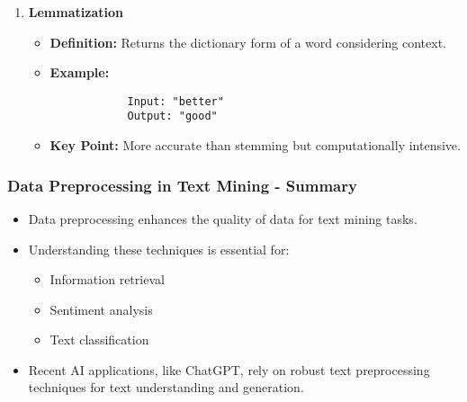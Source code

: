 \documentclass[aspectratio=169]{beamer}
\begin{document}
\begin{frame}[fragile]
\begin{enumerate}
        \item \textbf{Lemmatization}  
        \begin{itemize}
            \item \textbf{Definition:} Returns the dictionary form of a word considering context.
            \item \textbf{Example:} 
            \begin{lstlisting}
            Input: "better"
            Output: "good"
            \end{lstlisting}
            \item \textbf{Key Point:} More accurate than stemming but computationally intensive.
        \end{itemize}
    \end{enumerate}
\end{frame}

\begin{frame}[fragile]
    \frametitle{Data Preprocessing in Text Mining - Summary}

    \begin{itemize}
        \item Data preprocessing enhances the quality of data for text mining tasks.
        \item Understanding these techniques is essential for:
        \begin{itemize}
            \item Information retrieval
            \item Sentiment analysis
            \item Text classification
        \end{itemize}
        \item Recent AI applications, like ChatGPT, rely on robust text preprocessing techniques for text understanding and generation.
    \end{itemize}
\end{frame}
\end{document}
